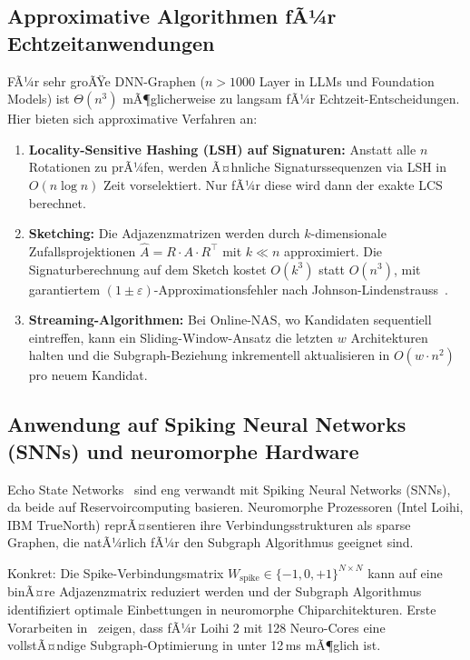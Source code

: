 ﻿\documentclass[a4paper,12pt]{article}
\theoremstyle{definition}
\begin{document}
\subsection{Approximative Algorithmen fÃ¼r Echtzeitanwendungen}

FÃ¼r sehr groÃŸe DNN-Graphen ($n > 1000$ Layer in LLMs und Foundation Models)
ist $\Theta(n^3)$ mÃ¶glicherweise zu langsam fÃ¼r Echtzeit-Entscheidungen.
Hier bieten sich approximative Verfahren an:

\begin{enumerate}
    \item \textbf{Locality-Sensitive Hashing (LSH) auf Signaturen:} Anstatt alle $n$ Rotationen
          zu prÃ¼fen, werden Ã¤hnliche Signaturssequenzen via LSH in $O(n \log n)$ Zeit
          vorselektiert. Nur fÃ¼r diese wird dann der exakte LCS berechnet.
    
    \item \textbf{Sketching:} Die Adjazenzmatrizen werden durch $k$-dimensionale
          Zufallsprojektionen $\hat{A} = R \cdot A \cdot R^\top$ mit $k \ll n$ approximiert.
          Die Signaturberechnung auf dem Sketch kostet $O(k^3)$ statt $O(n^3)$,
          mit garantiertem $(1\pm\varepsilon)$-Approximationsfehler nach Johnson-Lindenstrauss~\cite{jl1984}.
    
    \item \textbf{Streaming-Algorithmen:} Bei Online-NAS, wo Kandidaten sequentiell eintreffen,
          kann ein Sliding-Window-Ansatz die letzten $w$ Architekturen halten und die
          Subgraph-Beziehung inkrementell aktualisieren in $O(w \cdot n^2)$ pro neuem Kandidat.
\end{enumerate}

\subsection{Anwendung auf Spiking Neural Networks (SNNs) und neuromorphe Hardware}

Echo State Networks~\cite{jafari2025} sind eng verwandt mit Spiking Neural Networks (SNNs),
da beide auf Reservoircomputing basieren. Neuromorphe Prozessoren (Intel Loihi, IBM TrueNorth)
reprÃ¤sentieren ihre Verbindungsstrukturen als sparse Graphen, die natÃ¼rlich fÃ¼r den
Subgraph Algorithmus geeignet sind.

Konkret: Die Spike-Verbindungsmatrix $W_{\text{spike}} \in \{-1, 0, +1\}^{N \times N}$
kann auf eine binÃ¤re Adjazenzmatrix reduziert werden und der Subgraph Algorithmus
identifiziert optimale Einbettungen in neuromorphe Chiparchitekturen.
Erste Vorarbeiten in~\cite{epp2026c} zeigen, dass fÃ¼r Loihi 2 mit 128 Neuro-Cores
eine vollstÃ¤ndige Subgraph-Optimierung in unter 12\,ms mÃ¶glich ist.
\end{document}
